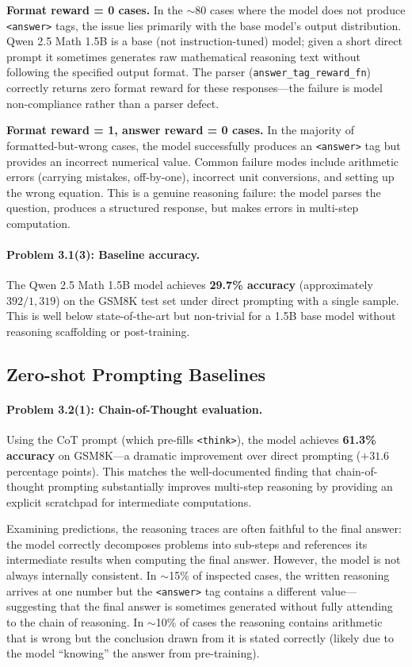 \documentclass[11pt]{article}
\begin{document}
\textbf{Format reward = 0 cases.} In the $\sim$80 cases where the model does not
produce \texttt{<answer>} tags, the issue lies primarily with the base model's output
distribution. Qwen 2.5 Math 1.5B is a base (not instruction-tuned) model; given a
short direct prompt it sometimes generates raw mathematical reasoning text without
following the specified output format. The parser (\texttt{answer\_tag\_reward\_fn})
correctly returns zero format reward for these responses---the failure is model
non-compliance rather than a parser defect.

\textbf{Format reward = 1, answer reward = 0 cases.} In the majority of formatted-but-wrong
cases, the model successfully produces an \texttt{<answer>} tag but provides an
incorrect numerical value. Common failure modes include arithmetic errors (carrying
mistakes, off-by-one), incorrect unit conversions, and setting up the wrong equation.
This is a genuine reasoning failure: the model parses the question, produces a
structured response, but makes errors in multi-step computation.

\paragraph{Problem 3.1(3): Baseline accuracy.}

The Qwen 2.5 Math 1.5B model achieves \textbf{29.7\% accuracy} (approximately
$392/1{,}319$) on the GSM8K test set under direct prompting with a single sample.
This is well below state-of-the-art but non-trivial for a 1.5B base model without
reasoning scaffolding or post-training.

\subsection{Zero-shot Prompting Baselines}

\paragraph{Problem 3.2(1): Chain-of-Thought evaluation.}

Using the CoT prompt (which pre-fills \texttt{<think>}), the model achieves
\textbf{61.3\% accuracy} on GSM8K---a dramatic improvement over direct prompting
($+31.6$ percentage points). This matches the well-documented finding that
chain-of-thought prompting substantially improves multi-step reasoning by providing
an explicit scratchpad for intermediate computations.

Examining predictions, the reasoning traces are often faithful to the final answer:
the model correctly decomposes problems into sub-steps and references its intermediate
results when computing the final answer. However, the model is not always internally
consistent. In $\sim$15\% of inspected cases, the written reasoning arrives at one
number but the \texttt{<answer>} tag contains a different value---suggesting that the
final answer is sometimes generated without fully attending to the chain of reasoning.
In $\sim$10\% of cases the reasoning contains arithmetic that is wrong but the
conclusion drawn from it is stated correctly (likely due to the model ``knowing'' the
answer from pre-training).
\end{document}
